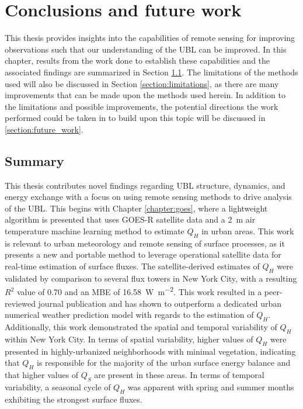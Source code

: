 \chapter{Conclusions and future work}
\label{chapter:Conclusions}
\thispagestyle{myheadings}

\graphicspath{{4_Conclusion/Figures/}}

This thesis provides insights into the capabilities of remote sensing for improving observations such that our understanding of the UBL can be improved. In this chapter, results from the work done to establish these capabilities and the associated findings are summarized in Section \ref{section:summary}. The limitations of the methods used will also be discussed in Section \ref{section:limitations}, as there are many improvements that can be made upon the methods used herein. In addition to the limitations and possible improvements, the potential directions the work performed could be taken in to build upon this topic will be discussed in \ref{section:future_work}.

\section{Summary}\label{section:summary}

This thesis contributes novel findings regarding UBL structure, dynamics, and energy exchange with a focus on using remote sensing methods to drive analysis of the UBL. This begins with Chapter \ref{chapter:goes}, where a lightweight algorithm is presented that uses GOES-R satellite data and a \SI{2}{\meter} air temperature machine learning method to estimate $Q_H$ in urban areas. This work is relevant to urban meteorology and remote sensing of surface processes, as it presents a new and portable method to leverage operational satellite data for real-time estimation of surface fluxes. The satellite-derived estimates of $Q_H$ were validated by comparison to several flux towers in New York City, with a resulting $R^2$ value of 0.70 and an MBE of \SI{16.58}{\watt\per\meter\squared}. This work resulted in a peer-reviewed journal publication \citep{rios2022novel} and has shown to outperform a dedicated urban numerical weather prediction model with regards to the estimation of $Q_H$. Additionally, this work demonstrated the spatial and temporal variability of $Q_H$ within New York City. In terms of spatial variability, higher values of $Q_H$ were presented in highly-urbanized neighborhoods with minimal vegetation, indicating that $Q_H$ is responsible for the majority of the urban surface energy balance and that higher values of $Q_S$ are present in these areas. In terms of temporal variability, a seasonal cycle of $Q_H$ was apparent with spring and summer months exhibiting the strongest surface fluxes. 

